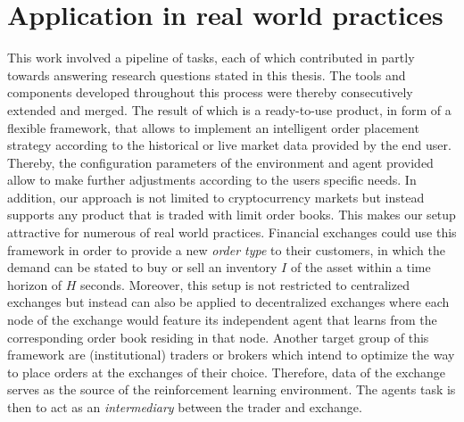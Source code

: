 \section{Application in real world practices}

This work involved a pipeline of tasks, each of which contributed in partly towards answering research questions stated in this thesis.
The tools and components developed throughout this process were thereby consecutively extended and merged.
The result of which is a ready-to-use product, in form of a flexible framework, that allows to implement an intelligent order placement strategy according to the historical or live market data provided by the end user.
Thereby, the configuration parameters of the environment and agent provided allow to make further adjustments according to the users specific needs.
In addition, our approach is not limited to cryptocurrency markets but instead supports any product that is traded with limit order books.
This makes our setup attractive for numerous of real world practices.
Financial exchanges could use this framework in order to provide a new \textit{order type} to their customers, in which the demand can be stated to buy or sell an inventory $I$ of the asset within a time horizon of $H$ seconds.
Moreover, this setup is not restricted to centralized exchanges but instead can also be applied to decentralized exchanges where each node of the exchange would feature its independent agent that learns from the corresponding order book residing in that node.
Another target group of this framework are (institutional) traders or brokers which intend to optimize the way to place orders at the exchanges of their choice.
Therefore, data of the exchange serves as the source of the reinforcement learning environment. 
The agents task is then to act as an \textit{intermediary} between the trader and exchange.